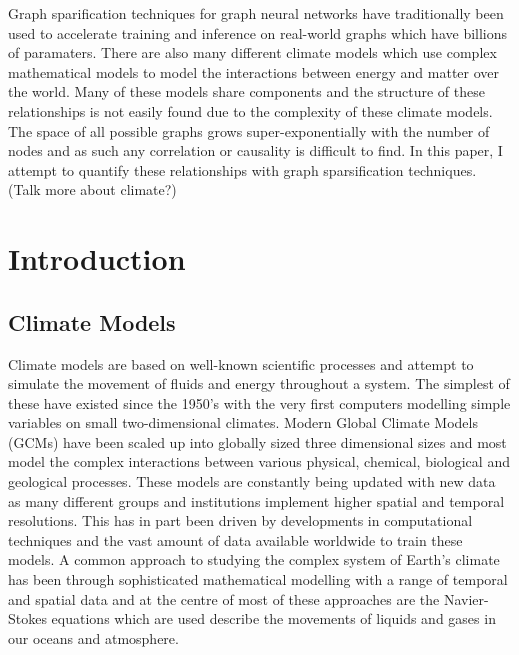 \documentclass[honours,12pt]{unswthesis}
\newcommand\blankpage{%
    \null
    \thispagestyle{empty}%
    \addtocounter{page}{-1}%
    \newpage}
\numberwithin{equation}{section}
\begin{document}

\afterpage{\blankpage}



Graph sparification techniques for graph neural networks have traditionally been used to 
accelerate training and inference on real-world graphs which have billions of paramaters.
There are also many different climate models which use complex mathematical models to model 
the interactions between energy and matter over the world. Many of these models share 
components and the structure of these relationships is not easily found due to the complexity of
these climate models. The space of all possible graphs grows super-exponentially with the number 
of nodes and as such any correlation or causality is difficult to find. In this paper, I attempt 
to quantify these relationships with graph sparsification techniques.
(Talk more about climate?)
\afterpage{\blankpage}


\afterpreface

%
%

\afterpage{\blankpage}

\chapter{Introduction}\label{s-intro}

{\section{Climate Models}}\label{climate-introduction}

{\noindent}Climate models are based on well-known scientific processes and attempt to simulate the movement of fluids and energy throughout a system. 
The simplest of these have existed since the 1950's with the very first computers modelling simple variables on small two-dimensional climates\cite{edwards2011history}.
Modern Global Climate Models (GCMs) have been scaled up into globally sized three dimensional sizes and most model the complex interactions between various physical, chemical, biological and geological processes. 
These models are constantly being updated with new data as many different groups and institutions implement higher spatial and temporal resolutions.
This has in part been driven by developments in computational techniques and the vast amount of data available worldwide to train these models.\cite{Overpeck2011}
A common approach to studying the complex system of Earth's climate has been through sophisticated mathematical modelling with a range of temporal and spatial data\cite{Kulinich_2022}
and at the centre of most of these approaches are the Navier-Stokes equations which are used describe the movements of liquids and gases in our oceans and atmosphere.\cite{Palmer2008} \\
\end{document}
